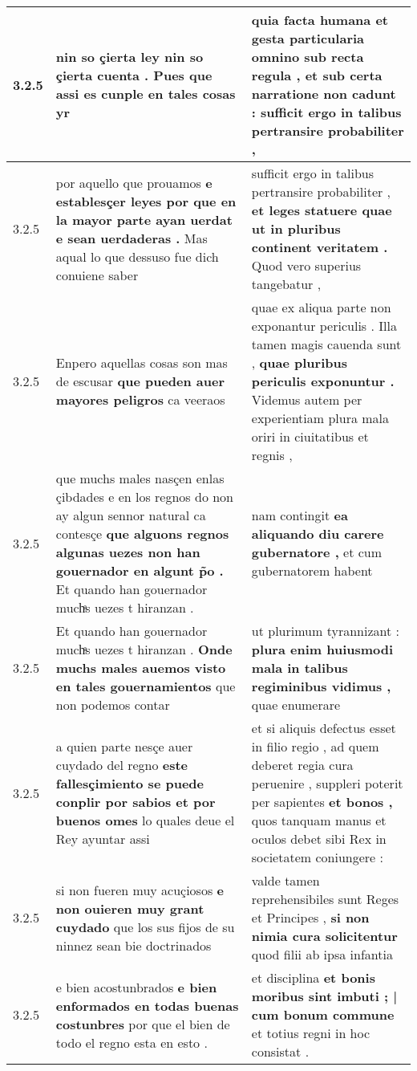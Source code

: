 \begin{tabular}{|p{1cm}|p{6.5cm}|p{6.5cm}|}
3.2.5 & nin so çierta ley \textbf{ nin so çierta cuenta . } Pues que assi es cunple en tales cosas yr & quia facta humana et gesta particularia omnino sub recta regula , \textbf{ et sub certa narratione non cadunt : } sufficit ergo in talibus pertransire probabiliter , \\\hline
3.2.5 & por aquello que prouamos \textbf{ e establesçer leyes por que en la mayor parte ayan uerdat e sean uerdaderas . } Mas aqual lo que dessuso fue dich conuiene saber & sufficit ergo in talibus pertransire probabiliter , \textbf{ et leges statuere quae ut in pluribus continent veritatem . } Quod vero superius tangebatur , \\\hline
3.2.5 & Enpero aquellas cosas son mas de escusar \textbf{ que pueden auer mayores peligros } ca veeraos & quae ex aliqua parte non exponantur periculis . Illa tamen magis cauenda sunt , \textbf{ quae pluribus periculis exponuntur . } Videmus autem per experientiam plura mala oriri in ciuitatibus et regnis , \\\hline
3.2.5 & que muchs males nasçen enlas çibdades e en los regnos do non ay algun sennor natural ca contesçe \textbf{ que alguons regnos algunas uezes non han gouernador en algunt p̃o . } Et quando han gouernador muchͣs uezes t hiranzan . & nam contingit \textbf{ ea aliquando diu carere gubernatore , } et cum gubernatorem habent \\\hline
3.2.5 & Et quando han gouernador muchͣs uezes t hiranzan . \textbf{ Onde muchs males auemos visto en tales gouernamientos } que non podemos contar & ut plurimum tyrannizant : \textbf{ plura enim huiusmodi mala in talibus regiminibus vidimus , } quae enumerare \\\hline
3.2.5 & a quien parte nesçe auer cuydado del regno \textbf{ este fallesçimiento se puede conplir por sabios et por buenos omes } lo quales deue el Rey ayuntar assi & et si aliquis defectus esset in filio regio , ad quem deberet regia cura peruenire , suppleri poterit per sapientes \textbf{ et bonos , } quos tanquam manus et oculos debet sibi Rex in societatem coniungere : \\\hline
3.2.5 & si non fueren muy acuçiosos \textbf{ e non ouieren muy grant cuydado } que los sus fijos de su ninnez sean bie doctrinados & valde tamen reprehensibiles sunt Reges et Principes , \textbf{ si non nimia cura solicitentur } quod filii ab ipsa infantia \\\hline
3.2.5 & e bien acostunbrados \textbf{ e bien enformados en todas buenas costunbres } por que el bien de todo el regno esta en esto . & et disciplina \textbf{ et bonis moribus sint imbuti ; | cum bonum commune } et totius regni in hoc consistat . \\\hline

\end{tabular}
